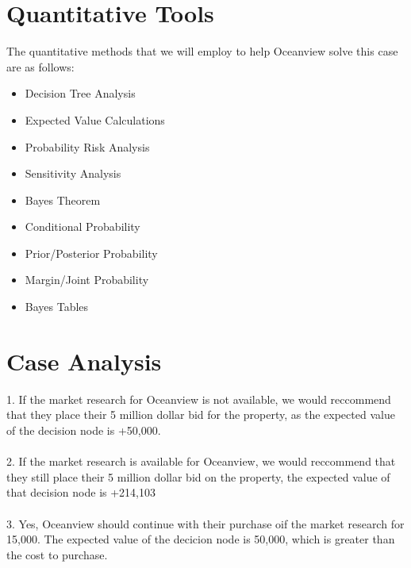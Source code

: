 \documentclass{article}
\begin{document}
\section*{Quantitative Tools}

The quantitative methods that we will employ to help Oceanview solve this case are as follows:

\begin{itemize}
    \item Decision Tree Analysis
    \item Expected Value Calculations
    \item Probability Risk Analysis
    \item Sensitivity Analysis
    \item Bayes Theorem
     \item Conditional Probability
     \item Prior/Posterior Probability
     \item Margin/Joint Probability
     \item Bayes Tables
\end{itemize}


\section{Case Analysis}
1. If the market research for Oceanview is not available, we would reccommend that they place their 5 million dollar bid for the property, as the expected value of the decision node is +50,000. \\ \\
2. If the market research is available for Oceanview, we would reccommend that they still place their 5 million dollar bid on the property, the expected value of that decision node is +214,103 \\ \\
3. Yes, Oceanview should continue with their purchase oif the market research for 15,000. The expected value of the decicion node is 50,000, which is greater than the cost to purchase. \\ \\ \\  \\ \\ \\ \\  \\  \\  \\ \\
\end{document}
